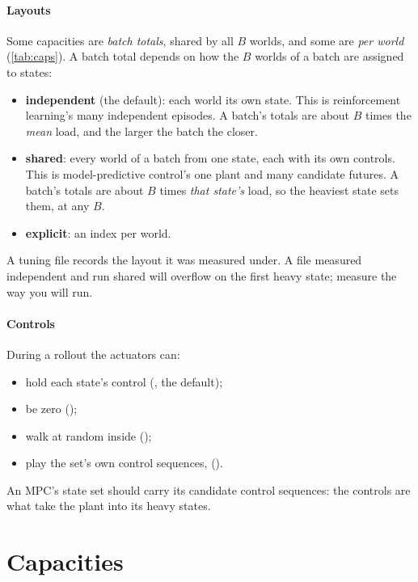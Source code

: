 \paragraph{Layouts} Some capacities are \emph{batch totals}, shared by all $B$ worlds, and some are \emph{per world} (\cref{tab:caps}). A batch total depends on how the $B$ worlds of a batch are assigned to states:

\begin{itemize}
\item \textbf{independent} (the default): each world its own state. This is reinforcement learning's many independent episodes. A batch's totals are about $B$ times the \emph{mean} load, and the larger the batch the closer.
\item \textbf{shared}: every world of a batch from one state, each with its own controls. This is model-predictive control's one plant and many candidate futures. A batch's totals are about $B$ times \emph{that state's} load, so the heaviest state sets them, at any $B$.
\item \textbf{explicit}: an index per world.
\end{itemize}

A tuning file records the layout it was measured under. A file measured independent and run shared will overflow on the first heavy state; measure the way you will run.

\paragraph{Controls} During a rollout the actuators can:

\begin{itemize}
\item hold each state's control (, the default);
\item be zero ();
\item walk at random inside  ();
\item play the set's own control sequences,  ().
\end{itemize}

An MPC's state set should carry its candidate control sequences: the controls are what take the plant into its heavy states.

\section{Capacities}\label{sec:capacities}

